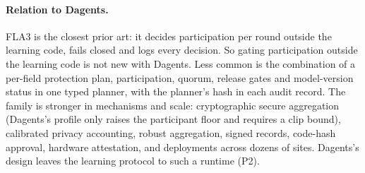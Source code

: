 \paragraph{Relation to Dagents.} FLA3 is the closest prior art: it decides
participation per round outside the learning code, fails closed and logs every
decision. So gating participation outside the learning code is not new with
Dagents. Less common is the combination of a per-field protection plan,
participation, quorum, release gates and model-version status in one typed
planner, with the planner's hash in each audit record. The family is stronger
in mechanisms and scale: cryptographic secure aggregation (Dagents's
 profile only raises the participant floor and
requires a clip bound), calibrated privacy accounting, robust aggregation,
signed records, code-hash approval, hardware attestation, and deployments
across dozens of sites. Dagents's design leaves the learning protocol to such a
runtime (P2).
